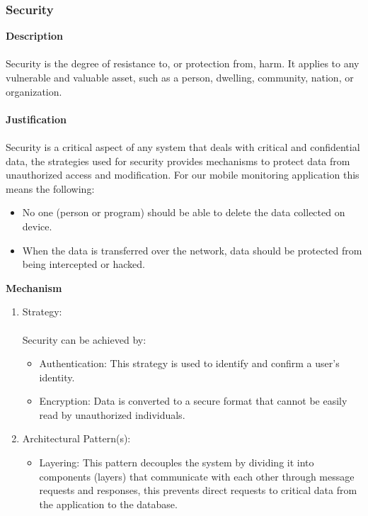 \documentclass[hidelinks, 12pt, oneside]{article}
\begin{document}
			\subsubsection*{Security}
				\textbf{Description} \\\\
				Security is the degree of resistance to, or protection from, harm. It applies to any vulnerable and valuable asset, such as a person, dwelling, community, nation, or organization.\\\\
				\textbf{Justification} \\\\
				Security is a critical aspect of any system that deals with critical and confidential data, the strategies used for security provides mechanisms to protect data from unauthorized access and modification. For our mobile monitoring application this means the following:
				\begin{itemize}
					\item No one (person or program) should be able to delete the data collected on device.
					\item When the data is transferred over the network, data should be protected from being intercepted or hacked.    
				\end{itemize}
				\textbf{Mechanism}
				\begin{enumerate}
					\item Strategy: \\\\
						Security can be achieved by:
						\begin{itemize}
							\item Authentication: This strategy is used to identify and confirm a user's identity.  
							\item Encryption: Data is converted to a secure format that cannot be easily read by unauthorized individuals. 
						\end{itemize}
					\item Architectural Pattern(s):
						\begin{itemize}
							\item Layering: This pattern decouples the system by dividing it into components (layers) that communicate with each other through message requests and responses, this prevents direct requests to critical data from the application to the database. 
						\end{itemize}
				\end{enumerate}		
\end{document}
